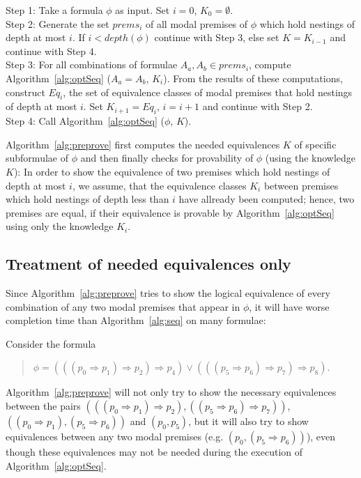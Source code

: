 \documentclass{entcs} \usepackage{entcsmacro}
\begin{document}
\begin{algorithm}[h]
\begin{alg}
  Step 1: Take a formula $\phi$ as input. Set $i=0$, $K_0=\emptyset$.\\
  Step 2: Generate the set $prems_i$ of all modal premises of $\phi$
  which hold nestings of depth at most $i$. If $i<depth(\phi)$ continue
  with Step 3, else set $K=K_{i-1}$ and continue with Step 4.\\
  Step 3: For all combinations of formulae $A_a,A_b\in prems_i$, compute
  Algorithm~\ref{alg:optSeq} ($A_a = A_b$, $K_i$). From the results of these computations,
  construct $Eq_i$, the set of equivalence classes of modal premises that hold
  nestings of depth at most $i$. Set $K_{i+1} = Eq_i$, $i = i + 1$ and
  continue with Step 2.\\
  Step 4: Call Algorithm~\ref{alg:optSeq} ($\phi$, $K$).
\label{alg:preprove}
\end{alg}
\end{algorithm}

Algorithm~\ref{alg:preprove} first computes the needed equivalences $K$ of specific 
subformulae of $\phi$ and then finally checks for provability of
$\phi$ (using the knowledge $K$): In order to show the equivalence of
two premises which hold nestings of depth at most $i$, we assume,
that the equivalence classes $K_{i}$ between premises which hold
nestings of depth less than $i$ have allready been computed; hence,
two premises are equal, if their equivalence is provable by
Algorithm~\ref{alg:optSeq} using only the knowledge $K_{i}$.

\subsection{Treatment of needed equivalences only}

Since Algorithm~\ref{alg:preprove} tries to show the logical equivalence of every combination
of any two modal premises that appear in $\phi$, it will have worse completion
time than Algorithm~\ref{alg:seq} on many formulae:

\begin{example}
Consider the formula 
\begin{quote}
$\phi=(((p_0\Rightarrow p_1)\Rightarrow p_2)\Rightarrow p_4)\vee
(((p_5\Rightarrow p_6)\Rightarrow p_7)\Rightarrow p_8)$.
\end{quote}
Algorithm~\ref{alg:preprove} will not only
try to show the necessary equivalences between the pairs
$(((p_0\Rightarrow p_1)\Rightarrow p_2), ((p_5\Rightarrow p_6)\Rightarrow p_7))$,
$((p_0\Rightarrow p_1), (p_5\Rightarrow p_6))$ and $(p_0,p_5)$, but it will
also try to show equivalences between any two modal premises (e.g. $(p_0,
(p_5\Rightarrow p_6))$), even though these equivalences may not be needed
during the execution of Algorithm~\ref{alg:optSeq}.
\end{example}
\end{document}
